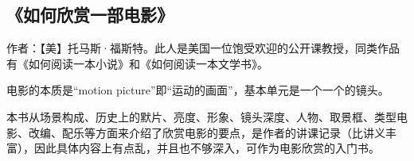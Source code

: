\subsection{《如何欣赏一部电影》}

作者：【美】托马斯·福斯特。此人是美国一位饱受欢迎的公开课教授，同类作品有《如何阅读一本小说》和《如何阅读一本文学书》。

电影的本质是“motion picture”即“运动的画面”，基本单元是一个一个的镜头。

本书从场景构成、历史上的默片、亮度、形象、镜头深度、人物、取景框、类型电影、改编、配乐等方面来介绍了欣赏电影的要点，是作者的讲课记录（比讲义丰富），因此具体内容上有点乱，并且也不够深入，可作为电影欣赏的入门书。